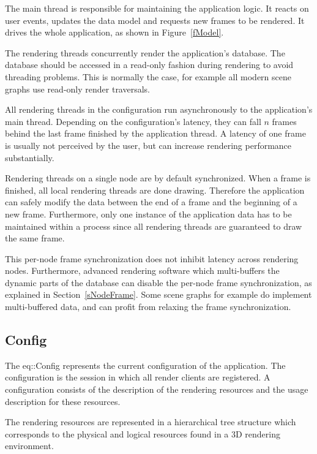 \documentclass[10pt,a4]{scrartcl}
\newcommand{\fig}[1]{Figure~\ref{#1}}
\newcommand{\sref}[1]{Section~\ref{#1}}
\begin{document}
The main thread is responsible for maintaining the application logic. It
reacts on user events, updates the data model and requests new frames to
be rendered. It drives the whole application, as shown in \fig{fModel}.

The rendering threads concurrently render the application's
database. The data\-base should be accessed in a read-only fashion
during rendering to avoid threading problems. This is normally the case,
for example all modern scene graphs use read-only render traversals.

All rendering threads in the configuration run asynchronously to the
application's main thread. Depending on the configuration's latency,
they can fall $n$ frames behind the last frame finished by the
application thread. A latency of one frame is usually not perceived by
the user, but can increase rendering performance substantially.

Rendering threads on a single node are by default synchronized. When a
frame is finished, all local rendering threads are done
drawing. Therefore the application can safely modify the data between
the end of a frame and the beginning of a new frame. Furthermore, only
one instance of the application data has to be maintained within a
process since all rendering threads are guaranteed to draw the same frame.

This per-node frame synchronization does not inhibit latency across
rendering nodes. Furthermore, advanced rendering software which
multi-buffers the dynamic parts of the database can disable the per-node
frame synchronization, as explained in \sref{sNodeFrame}. Some scene
graphs for example do implement multi-buffered data, and can profit from
relaxing the frame synchronization.



\subsection{\label{sConfig}Config}

The \textsf{eq::Config} represents the current configuration of the
application. The configuration is the session in which all render
clients are registered. A configuration consists of the description of
the rendering resources and the usage description for these resources.

The rendering resources are represented in a hierarchical tree structure
which corresponds to the physical and logical resources found in a 3D
rendering environment. 
\end{document}
